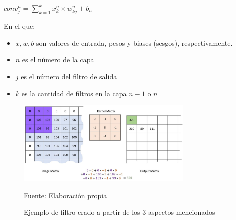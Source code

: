 		\begingroup\makeatletter{}\check@mathfonts
		\begin{center}
		${conv_j^n} ={\sum_{k=1}^k x_k^n \times w_{kj} ^n + b_n}$
		\end{center}
		\endgroup
		
		En el que:\vskip 0.1cm
		\begin{itemize}
			\item $x,w,b$ son valores de entrada, pesos y biases (sesgos), respectivamente.
			\item $n$ es el número de la capa
			\item $j$ es el número del filtro de salida
			\item $k$ es la cantidad de filtros en la capa $n-1$ o $n$
		\end{itemize}


		\begin{figure}[H]
		\begin{center}
		\includegraphics[width=0.75\textwidth]{images/marcoteorico/Convolution_calculation_borders}
		\end{center}
		\begin{center}
		\caption{\small{Ejemplo de filtro crado a partir de los 3 aspectos mencionados}}
		{\small{Fuente: Elaboración propia}}
		\end{center}
		\vspace{-1.9em}
		\end{figure}

		\vskip 0.3cm  
